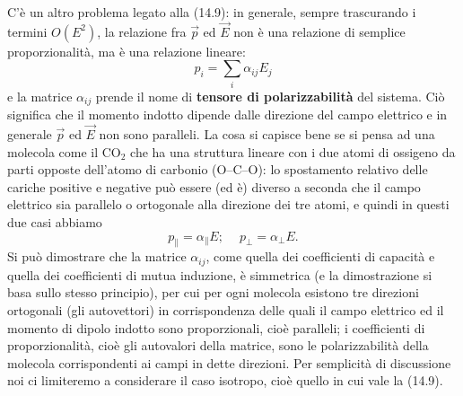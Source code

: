 C'\`e un altro problema legato alla (14.9): in generale, sempre trascurando i
termini $O(E^2)$, la relazione fra $\vec p$ ed $\vec E$ non \`e una relazione di
semplice proporzionalit\`a, ma \`e una relazione lineare:
\begin{equation}
  p_i=\textstyle\sum_i\alpha_{ij}E_j
  \tag{14.13}
\end{equation}
e la matrice $\alpha_{ij}$ prende il nome di \textbf{tensore di
polarizzabilit\`a} del sistema. Ci\`o significa che il momento indotto dipende
dalle direzione del campo elettrico e in generale $\vec p$ ed $\vec E$ non sono
paralleli. La cosa si capisce bene se si pensa ad una molecola come il CO$_2$
che ha una struttura lineare con i due atomi di ossigeno da parti opposte
dell'atomo di carbonio (O--C--O): lo spostamento relativo delle cariche positive
e negative pu\`o essere (ed \`e) diverso a seconda che il campo elettrico sia
parallelo o ortogonale alla direzione dei tre atomi, e quindi in questi due casi
abbiamo
\begin{equation}
  p_\parallel=\alpha_\parallel E;\quad\ p_\perp=\alpha_\perp E.
  \tag{14.14}
\end{equation}
Si pu\`o dimostrare che la matrice $\alpha_{ij}$, come quella dei coefficienti
di capacit\`a e quella dei coefficienti di mutua induzione, \`e simmetrica (e la
dimostrazione si basa sullo stesso principio), per cui per ogni molecola
esistono tre direzioni ortogonali (gli autovettori) in corrispondenza delle
quali il campo elettrico ed il momento di dipolo indotto sono proporzionali,
cio\`e paralleli; i coefficienti di proporzionalit\`a, cio\`e gli autovalori
della matrice, sono le polarizzabilit\`a della molecola corrispondenti ai campi
in dette direzioni. Per semplicit\`a di discussione noi ci limiteremo a
considerare il caso isotropo, cio\`e quello in cui vale la (14.9).

